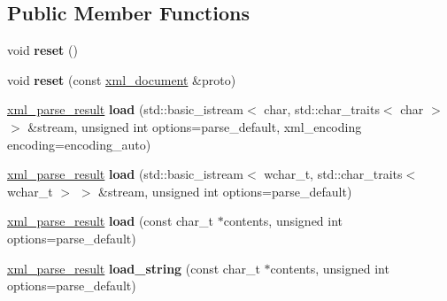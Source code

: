 \subsection*{Public Member Functions}
\begin{DoxyCompactItemize}
\item 
\mbox{\label{classpugi_1_1xml__document_acf2b9daf1d12e12048796118b7a7685d}} 
void {\bfseries reset} ()
\item 
\mbox{\label{classpugi_1_1xml__document_a4230de3de88f4fe481c4c3d5312aa5cf}} 
void {\bfseries reset} (const \hyperlink{classpugi_1_1xml__document}{xml\+\_\+document} \&proto)
\item 
\mbox{\label{classpugi_1_1xml__document_abb7db3882f94ac35b870510789a87778}} 
\hyperlink{structpugi_1_1xml__parse__result}{xml\+\_\+parse\+\_\+result} {\bfseries load} (std\+::basic\+\_\+istream$<$ char, std\+::char\+\_\+traits$<$ char $>$ $>$ \&stream, unsigned int options=parse\+\_\+default, xml\+\_\+encoding encoding=encoding\+\_\+auto)
\item 
\mbox{\label{classpugi_1_1xml__document_a36131b6f1a80a1248666f4e7fe352685}} 
\hyperlink{structpugi_1_1xml__parse__result}{xml\+\_\+parse\+\_\+result} {\bfseries load} (std\+::basic\+\_\+istream$<$ wchar\+\_\+t, std\+::char\+\_\+traits$<$ wchar\+\_\+t $>$ $>$ \&stream, unsigned int options=parse\+\_\+default)
\item 
\mbox{\label{classpugi_1_1xml__document_ae17a77772fa21a40f3d91d9c79e60d0b}} 
\hyperlink{structpugi_1_1xml__parse__result}{xml\+\_\+parse\+\_\+result} {\bfseries load} (const char\+\_\+t $\ast$contents, unsigned int options=parse\+\_\+default)
\item 
\mbox{\label{classpugi_1_1xml__document_a706a276ee3d5010f2bb8c7eacb75a891}} 
\hyperlink{structpugi_1_1xml__parse__result}{xml\+\_\+parse\+\_\+result} {\bfseries load\+\_\+string} (const char\+\_\+t $\ast$contents, unsigned int options=parse\+\_\+default)
\item 
\mbox{\label{classpugi_1_1xml__document_aad350209a4a91589fbd7e8cdaf79e010}} 

\end{DoxyCompactItemize}

